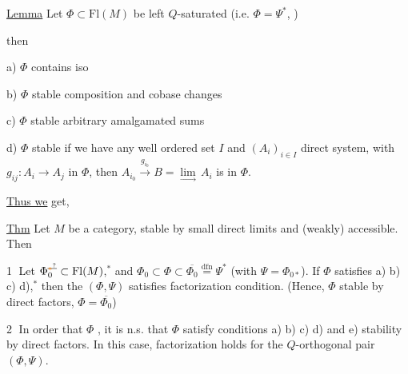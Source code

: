 
\uline{Lemma} Let $\Phi\subset\mathrm{Fl}(M)$ be left $Q$-saturated (i.e. $\Phi=\Psi^*$, )

then  \unsure{(}

a) $\Phi$ contains iso

b) $\Phi$ stable   composition and cobase changes

c) $\Phi$ stable    arbitrary  amalgamated sums


d) $\Phi$ stable    if we have any well ordered set $I$ and $(A_i)_{i\in I}$ direct system, with $g_{ij}\colon A_i\to A_j$ in $\Phi$,  then  $A_{i_0}\xrightarrow{g_{i_0}}B=\underset{\longrightarrow}{\lim}\, A_i$ is in $\Phi$.


\uline{Thus we} get,

\uline{Thm} Let $M$ be a category, stable by small direct limits and (weakly) accessible. Then

\textcircled{1}  Let $\Phi_0^{\deleted{\unsure{*}}}\subset\mathrm{Fl}(M)$,$^*$ and $\Phi_0\subset\Phi\subset\overline{\Phi_0}\overset{\mathrm{dfn}}{=}\Psi^*$ (with $\Psi=\Phi_{0*}$). If $\Phi$  satisfies a) b) c) d),$^*$ then the $(\Phi,\Psi)$ satisfies factorization condition. (Hence, $\Phi$ stable by direct factors, $\Phi=\overline{\Phi_0}$)



\textcircled{2}  In order that $\Phi$  , it is n.s. that $\Phi$ satisfy conditions a) b) c) d) and e) stability by direct factors. In this case, factorization holds for the $Q$-orthogonal pair $(\Phi,\Psi)$.


